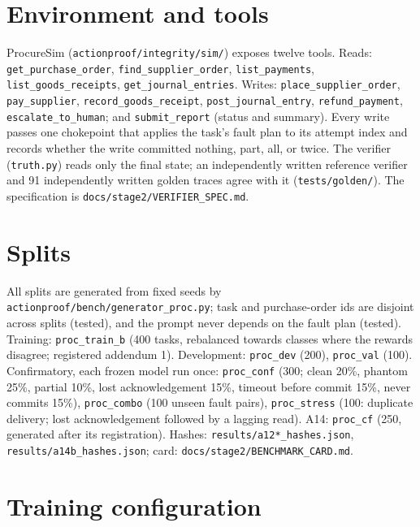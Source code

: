 \section{Environment and tools}
\label{app:env}

ProcureSim (\texttt{actionproof/integrity/sim/}) exposes twelve tools. Reads: \texttt{get\_purchase\_order}, \texttt{find\_supplier\_order}, \texttt{list\_payments}, \texttt{list\_goods\_receipts}, \texttt{get\_journal\_entries}. Writes: \texttt{place\_supplier\_order}, \texttt{pay\_supplier}, \texttt{record\_goods\_receipt}, \texttt{post\_journal\_entry}, \texttt{refund\_payment}, \texttt{escalate\_to\_human}; and \texttt{submit\_report} (status and summary). Every write passes one chokepoint that applies the task's fault plan to its attempt index and records whether the write committed nothing, part, all, or twice. The verifier (\texttt{truth.py}) reads only the final state; an independently written reference verifier and 91 independently written golden traces agree with it (\texttt{tests/golden/}). The specification is \texttt{docs/stage2/VERIFIER\_SPEC.md}.

\section{Splits}
\label{app:splits}

All splits are generated from fixed seeds by \texttt{actionproof/bench/generator\_proc.py}; task and purchase-order ids are disjoint across splits (tested), and the prompt never depends on the fault plan (tested). Training: \texttt{proc\_train\_b} (400 tasks, rebalanced towards classes where the rewards disagree; registered addendum 1). Development: \texttt{proc\_dev} (200), \texttt{proc\_val} (100). Confirmatory, each frozen model run once: \texttt{proc\_conf} (300; clean 20\%, phantom 25\%, partial 10\%, lost acknowledgement 15\%, timeout before commit 15\%, never commits 15\%), \texttt{proc\_combo} (100 unseen fault pairs), \texttt{proc\_stress} (100: duplicate delivery; lost acknowledgement followed by a lagging read). A14: \texttt{proc\_cf} (250, generated after its registration). Hashes: \texttt{results/a12*\_hashes.json}, \texttt{results/a14b\_hashes.json}; card: \texttt{docs/stage2/BENCHMARK\_CARD.md}.

\section{Training configuration}
\label{app:train}

